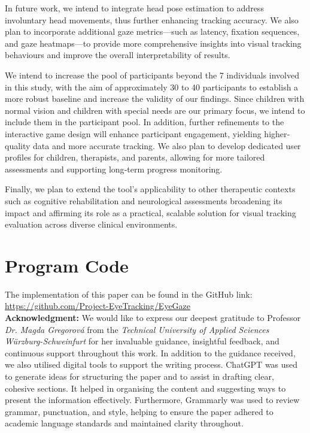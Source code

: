 \documentclass[10pt,a4paper,twoside]{article}
\begin{document}
In future work, we intend to integrate head pose estimation to address involuntary head movements, thus further enhancing tracking accuracy. We also plan to incorporate additional gaze metrics—such as latency, fixation sequences, and gaze heatmaps—to provide more comprehensive insights into visual tracking behaviours and improve the overall interpretability of results.

We intend to increase the pool of participants beyond the 7 individuals involved in this study, with the aim of approximately 30 to 40 participants to establish a more robust baseline and increase the validity of our findings. Since children with normal vision and children with special needs are our primary focus, we intend to include them in the participant pool. In addition, further refinements to the interactive game design will enhance participant engagement, yielding higher‐quality data and more accurate tracking. We also plan to develop dedicated user profiles for children, therapists, and parents, allowing for more tailored assessments and supporting long‐term progress monitoring.

Finally, we plan to extend the tool’s applicability to other therapeutic contexts such as cognitive rehabilitation and neurological assessments broadening its impact and affirming its role as a practical, scalable solution for visual tracking evaluation across diverse clinical environments.

\section{Program Code}
The implementation of this paper can be found in the GitHub link: \href{https://github.com/Project-EyeTracking/EyeGaze}{https://github.com/Project-EyeTracking/EyeGaze}\\


\hspace*{-0.5cm} \textbf{Acknowledgment:} We would like to express our deepest gratitude to Professor \emph{Dr. Magda Gregorová} from the \emph{Technical University of Applied Sciences Würzburg-Schweinfurt} for her invaluable guidance, insightful feedback, and continuous support throughout this work. In addition to the guidance received, we also utilised digital tools to support the writing process. ChatGPT was used to generate ideas for structuring the paper and to assist in drafting clear, cohesive sections. It helped in organising the content and suggesting ways to present the information effectively. Furthermore, Grammarly was used to review grammar, punctuation, and style, helping to ensure the paper adhered to academic language standards and maintained clarity throughout.
\end{document}
